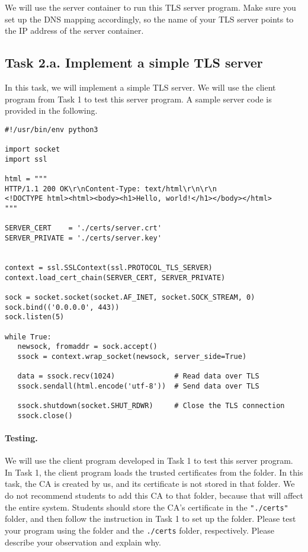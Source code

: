 We will use the server container to run this TLS server program.
Make sure you set up the DNS mapping accordingly, so 
the name of your TLS server points to the IP address of the 
server container. 




\subsection{Task 2.a. Implement a simple TLS server}

In this task, we will implement a simple TLS server. We will
use the client program from Task 1 to test this server program.
A sample server code is provided in the following.


\begin{lstlisting}[caption={\texttt{server.py}}, label={tls:server}]
#!/usr/bin/env python3

import socket
import ssl

html = """
HTTP/1.1 200 OK\r\nContent-Type: text/html\r\n\r\n
<!DOCTYPE html><html><body><h1>Hello, world!</h1></body></html>
"""

SERVER_CERT    = './certs/server.crt'
SERVER_PRIVATE = './certs/server.key'


context = ssl.SSLContext(ssl.PROTOCOL_TLS_SERVER) 
context.load_cert_chain(SERVER_CERT, SERVER_PRIVATE)

sock = socket.socket(socket.AF_INET, socket.SOCK_STREAM, 0)
sock.bind(('0.0.0.0', 443))
sock.listen(5)

while True:
   newsock, fromaddr = sock.accept()
   ssock = context.wrap_socket(newsock, server_side=True)

   data = ssock.recv(1024)              # Read data over TLS
   ssock.sendall(html.encode('utf-8'))  # Send data over TLS

   ssock.shutdown(socket.SHUT_RDWR)     # Close the TLS connection
   ssock.close()
\end{lstlisting}
 


\paragraph{Testing.}
We will use the client program developed in Task 1 to test this 
server program.
In Task 1, the client program loads the trusted certificates from the 
 folder. 
In this task, the CA is created by us, and its
certificate is not stored in that folder. We do not recommend students 
to add this CA to that folder, because that will affect the entire 
system. Students should store the CA's certificate in 
the \texttt{"./certs"} folder, and then follow the instruction
in Task 1 to set up the folder. 
Please test your program using the  folder
and the \texttt{./certs} folder, respectively. 
Please describe your observation and explain why.



